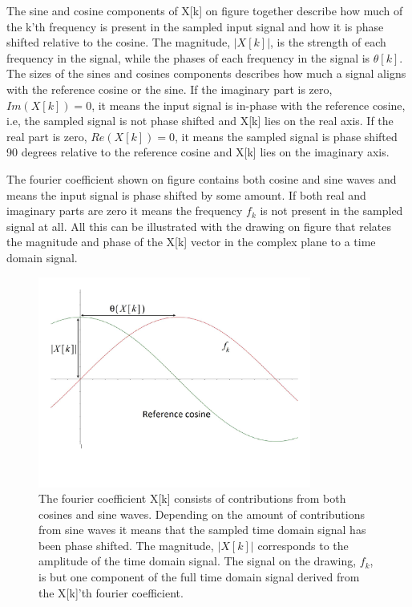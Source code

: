 The sine and cosine components of X[k] on figure  together describe how much of the k'th frequency is present in the sampled input signal and how it is phase shifted relative to the cosine. The magnitude, $|X[k]|$, is the strength of each frequency in the signal, while the phases of each frequency in the signal is $\theta[k]$. The sizes of the sines and cosines components describes how much a signal aligns with the reference cosine or the sine. If the imaginary part is zero, $Im(X[k]) = 0$,  it means the input signal is in-phase with the reference cosine, i.e, the sampled signal is not phase shifted and X[k] lies on the real axis. If the real part is zero, $Re(X[k]) = 0$, it means the sampled signal is phase shifted 90 degrees relative to the reference cosine and X[k] lies on the imaginary axis.

The fourier coefficient shown on figure  contains both cosine and sine waves and means the input signal is phase shifted by some amount. If both real and imaginary parts are zero it means the frequency $f_k$ is not present in the sampled signal at all. All this can be illustrated with the drawing on figure  that relates the magnitude and phase of the X[k] vector in the complex plane to a time domain signal.

\begin{figure}[H]
    \centering
    \includegraphics[clip, trim=0 50 0 0, width=0.8\textwidth]{Sections/7_SystemDesign/Figures/7_3_2_DFT_TIME.pdf}
    \caption{The fourier coefficient X[k] consists of contributions from both cosines and sine waves. Depending on the amount of contributions from sine waves it means that the sampled time domain signal has been phase shifted. The magnitude, $|X[k]|$ corresponds to the amplitude of the time domain signal. The signal on the drawing, $f_k$, is but one component of the full time domain signal derived from the X[k]'th fourier coefficient.}
    \label{fig:7_3_2_DFTU2}
\end{figure}

